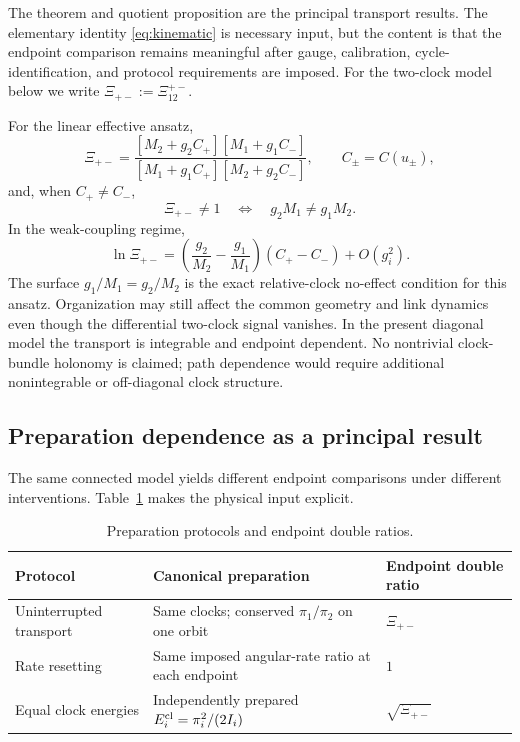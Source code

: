 \documentclass[11pt]{article}
\theoremstyle{plain}
\begin{document}
The theorem and quotient proposition are the principal transport results.
The elementary identity \eqref{eq:kinematic} is necessary input, but the
content is that the endpoint comparison remains meaningful after gauge,
calibration, cycle-identification, and protocol requirements are imposed.
For the two-clock model below we write
$\Xi_{+-}:=\Xi_{12}^{+-}$.

For the linear effective ansatz,
\begin{equation}
\Xi_{+-}=\frac{[M_2+g_2C_+][M_1+g_1C_-]}{[M_1+g_1C_+][M_2+g_2C_-]},\qquad C_\pm=C(u_\pm),
\end{equation}
and, when $C_+\ne C_-$,
\begin{equation}
\Xi_{+-}\ne1\quad\Longleftrightarrow\quad g_2M_1\ne g_1M_2.
\end{equation}
In the weak-coupling regime,
\begin{equation}
\ln\Xi_{+-}=\left(\frac{g_2}{M_2}-\frac{g_1}{M_1}\right)(C_+-C_-)+O(g_i^2).
\end{equation}
The surface $g_1/M_1=g_2/M_2$ is the exact relative-clock no-effect condition for this ansatz. Organization may still affect the common geometry and link dynamics even though the differential two-clock signal vanishes. In the present diagonal model the transport is integrable and endpoint dependent. No nontrivial clock-bundle holonomy is claimed; path dependence would require additional nonintegrable or off-diagonal clock structure.

\subsection{Preparation dependence as a principal result}

The same connected model yields different endpoint comparisons under different interventions. Table~\ref{tab:protocols} makes the physical input explicit.
\begin{table}[ht]
\centering
\small
\begin{tabularx}{\textwidth}{@{}l>{\raggedright\arraybackslash}Xl@{}}
\toprule
Protocol & Canonical preparation & Endpoint double ratio\\
\midrule
Uninterrupted transport & Same clocks; conserved $\pi_1/\pi_2$ on one orbit & $\Xi_{+-}$\\
Rate resetting & Same imposed angular-rate ratio at each endpoint & $1$\\
Equal clock energies & Independently prepared $E_i^{\rm cl}=\pi_i^2/(2I_i)$ & $\sqrt{\Xi_{+-}}$\\
\bottomrule
\end{tabularx}
\caption{Preparation protocols and endpoint double ratios.}
\label{tab:protocols}
\end{table}
\end{document}
